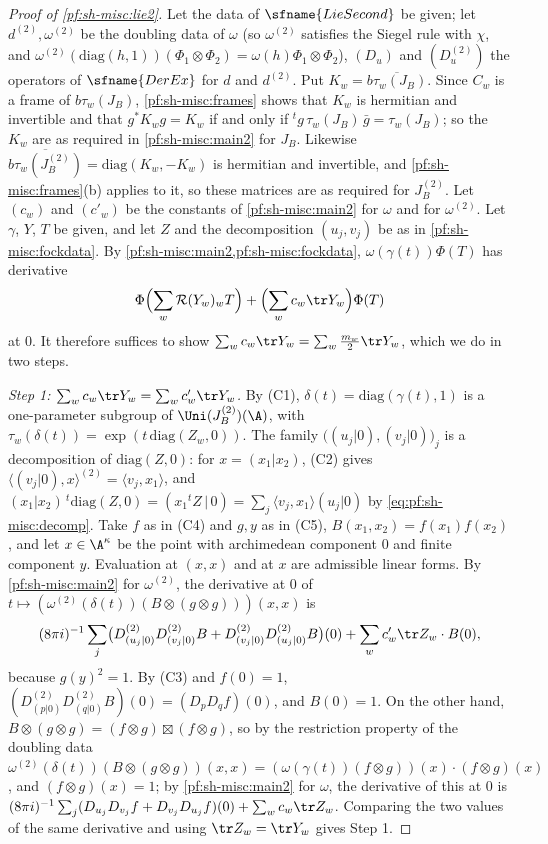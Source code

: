 \begin{proof}[Proof of \cref{pf:sh-misc:lie2}]
Let the data of $\sfname{LieSecond}$ be given; let $d^{(2)},\omega^{(2)}$ be the doubling data of $\omega$ (so $\omega^{(2)}$ satisfies the
Siegel rule with $\chi$, and $\omega^{(2)}(\mathrm{diag}(h,1))(\Phi_1\otimes\Phi_2)=\omega(h)\Phi_1\otimes\Phi_2$), $(D_u)$ and $(D^{(2)}_u)$ the
operators of $\sfname{DerEx}$ for $d$ and $d^{(2)}$. Put $K_w=\overline{b\tau_w(J_B)}$. Since $C_w$ is a frame of $b\tau_w(J_B)$,
\cref{pf:sh-misc:frames} shows that $K_w$ is hermitian and invertible and that $g^*K_wg=K_w$ if and only if ${}^tg\,\tau_w(J_B)\,\bar
g=\tau_w(J_B)$; so the $K_w$ are as required in \cref{pf:sh-misc:main2} for $J_B$. Likewise $\overline{b\tau_w(J_B^{(2)})}=\mathrm{diag}(K_w,-K_w)$
is hermitian and invertible, and \cref{pf:sh-misc:frames}(b) applies to it, so these matrices are as required for $J_B^{(2)}$. Let $(c_w)$ and $(c'_w)$ be the constants of \cref{pf:sh-misc:main2} for $\omega$ and for $\omega^{(2)}$. Let $\gamma$, $Y$, $T$ be
given, and let $Z$ and the decomposition $(u_j,v_j)$ be as in \cref{pf:sh-misc:fockdata}. By \cref{pf:sh-misc:main2,pf:sh-misc:fockdata},
$\omega(\gamma(t))\Phi(T)$ has derivative
\begin{equation}\label{eq:pf:sh-misc:lieder}
\Phi\Bigl(\sum_w\shmiscR(Y_w)_wT\Bigr)+\Bigl(\sum_wc_w\tr Y_w\Bigr)\Phi(T)
\end{equation}
at $0$. It therefore suffices to show $\sum_wc_w\tr Y_w=\sum_w\frac{m_w}2\tr Y_w$, which we do in two steps.

\emph{Step 1: $\sum_wc_w\tr Y_w=\sum_wc'_w\tr Y_w$.} By (C1), $\delta(t)=\mathrm{diag}(\gamma(t),1)$ is a one-parameter subgroup of
$\Uni(J_B^{(2)})(\A)$, with $\tau_w(\delta(t))=\exp(t\,\mathrm{diag}(Z_w,0))$. The family $\bigl((u_j|0),(v_j|0)\bigr)_j$ is a decomposition of
$\mathrm{diag}(Z,0)$: for $x=(x_1|x_2)$, (C2) gives $\langle(v_j|0),x\rangle^{(2)}=\langle v_j,x_1\rangle$, and $(x_1|x_2)\,{}^t\mathrm{diag}(Z,0)=
(x_1{}^tZ\,|\,0)=\sum_j\langle v_j,x_1\rangle(u_j|0)$ by \eqref{eq:pf:sh-misc:decomp}. Take $f$ as in (C4) and $g,y$ as in (C5), $B(x_1,x_2)=f(x_1)f(x_2)$,
and let $x\in\A^\kappa$ be the point with archimedean component $0$ and finite component $y$. Evaluation at $(x,x)$ and at $x$ are admissible
linear forms. By \cref{pf:sh-misc:main2} for $\omega^{(2)}$, the derivative at $0$ of $t\mapsto(\omega^{(2)}(\delta(t))(B\otimes(g\otimes g)))(x,x)$ is
\[
(8\pi i)^{-1}\sum_j\bigl(D^{(2)}_{(u_j|0)}D^{(2)}_{(v_j|0)}B+D^{(2)}_{(v_j|0)}D^{(2)}_{(u_j|0)}B\bigr)(0)+\sum_wc'_w\tr Z_w\cdot B(0),
\]
because $g(y)^2=1$. By (C3) and $f(0)=1$, $(D^{(2)}_{(p|0)}D^{(2)}_{(q|0)}B)(0)=(D_pD_qf)(0)$, and $B(0)=1$. On the other hand,
$B\otimes(g\otimes g)=(f\otimes g)\boxtimes(f\otimes g)$, so by the restriction property of the doubling data
$\omega^{(2)}(\delta(t))(B\otimes(g\otimes g))(x,x)=(\omega(\gamma(t))(f\otimes g))(x)\cdot(f\otimes g)(x)$, and $(f\otimes g)(x)=1$; by
\cref{pf:sh-misc:main2} for $\omega$, the derivative of this at $0$ is $(8\pi i)^{-1}\sum_j(D_{u_j}D_{v_j}f+D_{v_j}D_{u_j}f)(0)+\sum_wc_w\tr Z_w$.
Comparing the two values of the same derivative and using $\tr Z_w=\tr Y_w$ gives Step 1.


\end{proof}
